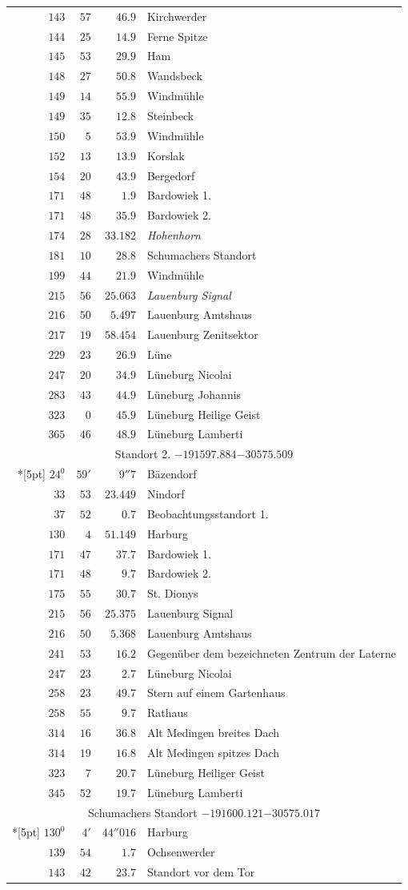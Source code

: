 \begin{longtable}{@{}rrrp{.61\linewidth}@{}}
\(143\)&\(57\)&\(46.9\)&\raggedright Kirchwerder\tabularnewline
\(144\)&\(25\)&\(14.9\)&\raggedright Ferne Spitze\tabularnewline
\(145\)&\(53\)&\(29.9\)&\raggedright Ham\tabularnewline
\(148\)&\(27\)&\(50.8\)&\raggedright Wandsbeck\tabularnewline
\(149\)&\(14\)&\(55.9\)&\raggedright Windmühle\tabularnewline
\(149\)&\(35\)&\(12.8\)&\raggedright Steinbeck\tabularnewline
\(150\)&\(5\)&\(53.9\)&\raggedright Windmühle\tabularnewline
\(152\)&\(13\)&\(13.9\)&\raggedright Korslak\tabularnewline
\(154\)&\(20\)&\(43.9\)&\raggedright Bergedorf\tabularnewline
\(171\)&\(48\)&\(1.9\)&\raggedright Bardowiek 1.\tabularnewline
\(171\)&\(48\)&\(35.9\)&\raggedright Bardowiek 2.\tabularnewline
\(174\)&\(28\)&\(33.182\)&\raggedright \textit{Hohenhorn}\tabularnewline
\(181\)&\(10\)&\(28.8\)&\raggedright Schumachers Standort\tabularnewline
\(199\)&\(44\)&\(21.9\)&\raggedright Windmühle\tabularnewline
\(215\)&\(56\)&\(25.663\)&\raggedright \textit{Lauenburg Signal}\tabularnewline
\(216\)&\(50\)&\(5.497\)&\raggedright Lauenburg Amtshaus\tabularnewline
\(217\)&\(19\)&\(58.454\)&\raggedright Lauenburg Zenitsektor\tabularnewline
\(229\)&\(23\)&\(26.9\)&\raggedright Lüne\tabularnewline
\(247\)&\(20\)&\(34.9\)&\raggedright Lüneburg Nicolai\tabularnewline
\(283\)&\(43\)&\(44.9\)&\raggedright Lüneburg Johannis\tabularnewline
\(323\)&\(0\)&\(45.9\)&\raggedright Lüneburg Heilige Geist\tabularnewline
\(365\)&\(46\)&\(48.9\)&\raggedright Lüneburg Lamberti\tabularnewline
\multicolumn{4}{c}{Standort 2. \(-191597.884\)\qquad\(-30575.509\)}\\*[5pt]
\(24^{0}\)&\(59'\)&\(9''7\)&\raggedright Bäzendorf\tabularnewline
\(33\)&\(53\)&\(23.449\)&\raggedright Nindorf\tabularnewline
\(37\)&\(52\)&\(0.7\)&\raggedright Beobachtungsstandort 1.\tabularnewline
\(130\)&\(4\)&\(51.149\)&\raggedright Harburg\tabularnewline
\(171\)&\(47\)&\(37.7\)&\raggedright Bardowiek 1.\tabularnewline
\(171\)&\(48\)&\(9.7\)&\raggedright Bardowiek 2.\tabularnewline
\(175\)&\(55\)&\(30.7\)&\raggedright St. Dionys\tabularnewline
\(215\)&\(56\)&\(25.375\)&\raggedright Lauenburg Signal\tabularnewline
\(216\)&\(50\)&\(5.368\)&\raggedright Lauenburg Amtshaus\tabularnewline
\(241\)&\(53\)&\(16.2\)&\raggedright Gegenüber dem bezeichneten Zentrum der Laterne\tabularnewline
\(247\)&\(23\)&\(2.7\)&\raggedright Lüneburg Nicolai\tabularnewline
\(258\)&\(23\)&\(49.7\)&\raggedright Stern auf einem Gartenhaus\tabularnewline
\(258\)&\(55\)&\(9.7\)&\raggedright Rathaus\tabularnewline
\(314\)&\(16\)&\(36.8\)&\raggedright Alt Medingen breites Dach\tabularnewline
\(314\)&\(19\)&\(16.8\)&\raggedright Alt Medingen spitzes Dach\tabularnewline
\(323\)&\(7\)&\(20.7\)&\raggedright Lüneburg Heiliger Geist\tabularnewline
\(345\)&\(52\)&\(19.7\)&\raggedright Lüneburg Lamberti\tabularnewline
\multicolumn{4}{c}{Schumachers Standort \(-191600.121\)\qquad\(-30575.017\)}\\*[5pt]
\(130^{0}\)&\(4'\)&\(44''016\)&\raggedright Harburg\tabularnewline
\(139\)&\(54\)&\(1.7\)&\raggedright Ochsenwerder\tabularnewline
\(143\)&\(42\)&\(23.7\)&\raggedright Standort vor dem Tor\tabularnewline
\end{longtable}
\endgroup

